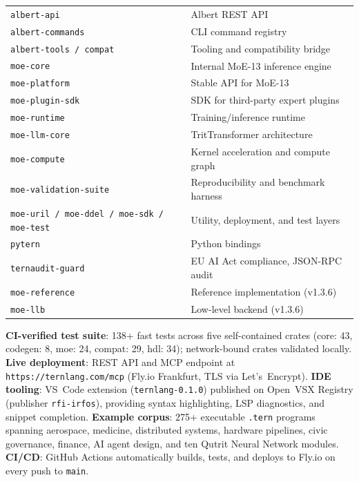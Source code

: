 \documentclass[journal,10pt,twocolumn]{IEEEtran}
\begin{document}
\begin{table}[h]
\begin{tabular}{p{2.6cm}p{5.0cm}}
\texttt{albert-api}         & Albert REST API \\
\texttt{albert-commands}    & CLI command registry \\
\texttt{albert-tools / compat} & Tooling and compatibility bridge \\
\midrule
\texttt{moe-core}           & Internal MoE-13 inference engine \\
\texttt{moe-platform}       & Stable API for MoE-13 \\
\texttt{moe-plugin-sdk}     & SDK for third-party expert plugins \\
\texttt{moe-runtime}        & Training/inference runtime \\
\texttt{moe-llm-core}       & TritTransformer architecture \\
\texttt{moe-compute}        & Kernel acceleration and compute graph \\
\texttt{moe-validation-suite} & Reproducibility and benchmark harness \\
\texttt{moe-uril / moe-ddel / moe-sdk / moe-test} & Utility, deployment, and test layers \\
\midrule
\texttt{pytern}             & Python bindings \\
\texttt{ternaudit-guard}    & EU AI Act compliance, JSON-RPC audit \\
\midrule
\texttt{moe-reference}      & Reference implementation (v1.3.6) \\
\texttt{moe-llb}            & Low-level backend (v1.3.6) \\
\bottomrule
\end{tabular}
\end{table}

\noindent\textbf{CI-verified test suite}: 138+ fast tests across five
self-contained crates (core: 43, codegen: 8, moe: 24, compat: 29, hdl: 34);
network-bound crates validated locally. \textbf{Live deployment}: REST API
and MCP endpoint at \texttt{https://ternlang.com/mcp} (Fly.io Frankfurt, TLS
via Let's~Encrypt). \textbf{IDE tooling}: VS~Code extension
(\texttt{ternlang-0.1.0}) published on Open~VSX Registry (publisher
\texttt{rfi-irfos}), providing syntax highlighting, LSP diagnostics, and
snippet completion. \textbf{Example corpus}: 275+ executable \texttt{.tern}
programs spanning aerospace, medicine, distributed systems, hardware
pipelines, civic governance, finance, AI agent design, and ten Qutrit Neural
Network modules. \textbf{CI/CD}: GitHub Actions automatically builds, tests,
and deploys to Fly.io on every push to \texttt{main}.
\end{document}
